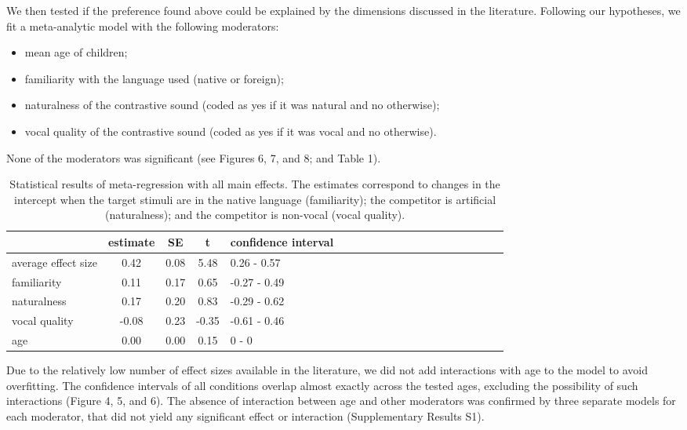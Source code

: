 \documentclass[man]{apa6}
\providecommand{\tightlist}{%
  \setlength{\itemsep}{0pt}\setlength{\parskip}{0pt}}
\begin{document}
We then tested if the preference found above could be explained by the
dimensions discussed in the literature. Following our hypotheses, we fit
a meta-analytic model with the following moderators:

\begin{itemize}
\tightlist
\item
  mean age of children;
\item
  familiarity with the language used (native or foreign);
\item
  naturalness of the contrastive sound (coded as yes if it was natural
  and no otherwise);
\item
  vocal quality of the contrastive sound (coded as yes if it was vocal
  and no otherwise).
\end{itemize}

None of the moderators was significant (see Figures 6, 7, and 8; and
Table 1).

\begin{table}[tbp]
\begin{center}
\begin{threeparttable}
\caption{\label{tab:Table1}Statistical results of meta-regression with all main effects. The estimates correspond to changes in the intercept when the target stimuli are in the native language (familiarity); the competitor is artificial (naturalness); and the competitor is non-vocal (vocal quality).}
\begin{tabular}{lccclccclccclccclccc}
\toprule
 & estimate & SE & t & confidence interval\\
\midrule
average effect size & 0.42 & 0.08 & 5.48 & 0.26 - 0.57\\
familiarity & 0.11 & 0.17 & 0.65 & -0.27 - 0.49\\
naturalness & 0.17 & 0.20 & 0.83 & -0.29 - 0.62\\
vocal quality & -0.08 & 0.23 & -0.35 & -0.61 - 0.46\\
age & 0.00 & 0.00 & 0.15 & 0 - 0\\
\bottomrule
\end{tabular}
\end{threeparttable}
\end{center}
\end{table}

Due to the relatively low number of effect sizes available in the
literature, we did not add interactions with age to the model to avoid
overfitting. The confidence intervals of all conditions overlap almost
exactly across the tested ages, excluding the possibility of such
interactions (Figure 4, 5, and 6). The absence of interaction between
age and other moderators was confirmed by three separate models for each
moderator, that did not yield any significant effect or interaction
(Supplementary Results S1).
\end{document}
